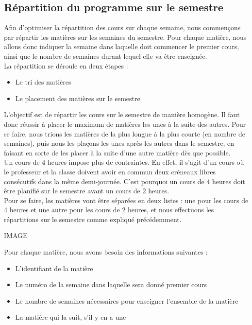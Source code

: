 \documentclass[12pt,a4paper,french]{article}
\begin{document}
\subsection{Répartition du programme sur le semestre}

Afin d'optimiser la répartition des cours sur chaque semaine, nous commençons par répartir les matières sur les semaines du semestre. Pour chaque matière, nous allons donc indiquer la semaine dans laquelle doit commencer le premier cours, ainsi que le nombre de semaines durant lequel elle va être enseignée.\\

La répartition se déroule en deux étapes : 
\begin{itemize}
\item Le tri des matières 
\item Le placement des matières sur le semestre\\
\end{itemize}

L'objectif est de répartir les cours sur le semestre de manière homogène. Il faut donc réussir à placer le maximum de matières les unes à la suite des autres. Pour se faire, nous trions les matières de la plus longue à la plus courte (en nombre de semaines), puis nous les plaçons les unes après les autres dans le semestre, en faisant en sorte de les placer à la suite d'une autre matière dès que possible.\\

Un cours de 4 heures impose plus de contraintes. En effet, il s'agit d'un cours où le professeur et la classe doivent avoir en commun deux créneaux libres consécutifs dans la même demi-journée. C'est pourquoi un cours de 4 heures doit être planifié sur le semestre avant un cours de 2 heures.\\

Pour se faire, les matières vont être séparées en deux listes : une pour les cours de 4 heures et une autre pour les cours de 2 heures, et nous effectuons les répartitions sur le semestre comme expliqué précédemment.

IMAGE

Pour chaque matière, nous avons besoin des informations suivantes :
\begin{itemize}
\item L'identifiant de la matière
\item Le numéro de la semaine dans laquelle sera donné premier cours
\item Le nombre de semaines nécessaires pour enseigner l'ensemble de la matière
\item La matière qui la suit, s'il y en a une
\end{itemize}
\end{document}
